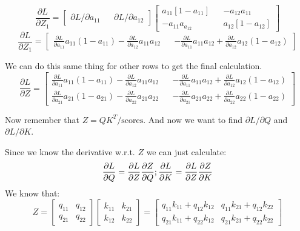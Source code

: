 \documentclass{article}
\begin{document}
$$
\frac{\partial L}{\partial Z_1} =
\begin{bmatrix}
    \partial L / \partial a_{11} && 
    \partial L / \partial a_{12}
\end{bmatrix}
\begin{bmatrix}
    a_{11}\left[1 - a_{11}\right] && 
    -a_{12}a_{11} \\
    -a_{11}a_{a_{12}} && 
    a_{12}\left[1 - a_{12}\right]
\end{bmatrix}
$$
$$
\frac{\partial L}{\partial Z_1} =
\begin{bmatrix}
    \frac{\partial L}{\partial a_{11}}a_{11}(1 - a_{11}) -
    \frac{\partial L}{\partial a_{12}}a_{11}a_{12} &&
    -\frac{\partial L}{\partial a_{11}}a_{11}a_{12} +
    \frac{\partial L}{\partial a_{12}}a_{12}(1 - a_{12})
\end{bmatrix}
$$

We can do this same thing for other rows to get the final calculation.
$$
\frac{\partial L}{\partial Z} =
\begin{bmatrix}
    \frac{\partial L}{\partial a_{11}}a_{11}(1 - a_{11}) -
    \frac{\partial L}{\partial a_{12}}a_{11}a_{12} &&
    -\frac{\partial L}{\partial a_{11}}a_{11}a_{12} +
    \frac{\partial L}{\partial a_{12}}a_{12}(1 - a_{12}) \\

    \frac{\partial L}{\partial a_{21}}a_{21}(1 - a_{21}) -
    \frac{\partial L}{\partial a_{22}}a_{21}a_{22} &&
    -\frac{\partial L}{\partial a_{21}}a_{21}a_{22} +
    \frac{\partial L}{\partial a_{22}}a_{22}(1 - a_{22})
\end{bmatrix}
$$

Now remember that $Z = QK^T / \text{scores}$. And now we want to find
$\partial L / \partial Q$ and $\partial L / \partial K$. 

Since we know the derivative w.r.t. $Z$ we can just calculate:
$$
\frac{\partial L}{\partial Q} = \frac{\partial L}{\partial Z}
\frac{\partial Z}{\partial Q}; \space
\frac{\partial L}{\partial K} = \frac{\partial L}{\partial Z}
\frac{\partial Z}{\partial K}
$$
We know that:
$$
Z =  \begin{bmatrix}
    q_{11} & q_{12} \\ q_{21} & q_{22}
\end{bmatrix}  \begin{bmatrix}
    k_{11} & k_{21} \\ k_{12} & k_{22}
\end{bmatrix}= \begin{bmatrix}
    q_{11}k_{11} + q_{12}k_{12} & q_{11}k_{21} + q_{12}k_{22} \\
    q_{21}k_{11} + q_{22}k_{12} & q_{21}k_{21} + q_{22}k_{22}
\end{bmatrix}
$$
\end{document}
